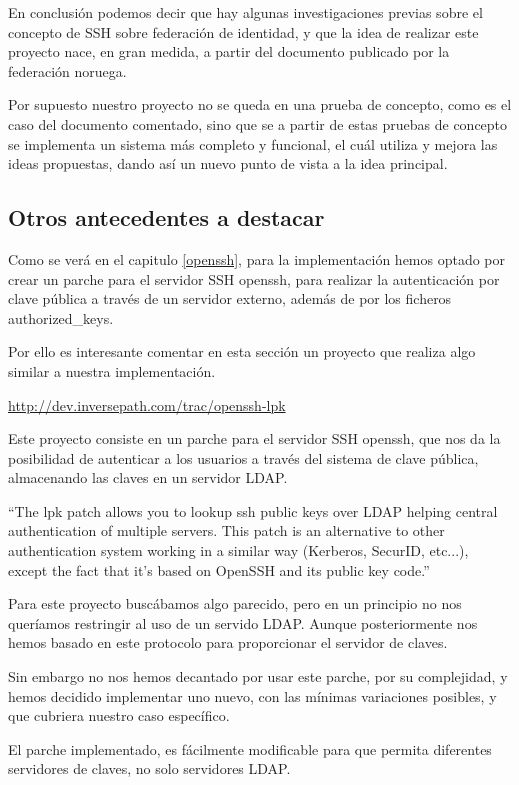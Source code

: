     En conclusión podemos decir que hay algunas investigaciones
    previas sobre el concepto de SSH sobre federación de identidad, y
    que la idea de realizar este proyecto nace, en gran medida, a
    partir del documento publicado por la federación noruega.
    
    Por supuesto nuestro proyecto no se queda en una prueba de
    concepto, como es el caso del documento comentado, sino que se a
    partir de estas pruebas de concepto se implementa un sistema
    más completo y funcional, el cuál utiliza y mejora las ideas
    propuestas, dando así un nuevo punto de vista a la idea principal.

    
    \subsection{Otros antecedentes a destacar}
    
        Como se verá en el capitulo \ref{openssh}, para la
        implementación hemos optado por crear un parche para el
        servidor SSH openssh, para realizar la autenticación por clave
        pública a través de un servidor externo, además de por los
        ficheros authorized\_keys.

        Por ello es interesante comentar en esta sección un proyecto
        que realiza algo similar a nuestra implementación.

        \href{http://dev.inversepath.com/trac/openssh-lpk}{http://dev.inversepath.com/trac/openssh-lpk}

        Este proyecto consiste en un parche para el servidor SSH
        openssh, que nos da la posibilidad de autenticar a los
        usuarios a través del sistema de clave pública, almacenando
        las claves en un servidor LDAP.

        ``The lpk patch allows you to lookup ssh public keys over LDAP
        helping central authentication of multiple servers. This patch
        is an alternative to other authentication system working in a
        similar way (Kerberos, SecurID, etc...), except the fact that
        it's based on OpenSSH and its public key code.''
        
        Para este proyecto buscábamos algo parecido, pero en un
        principio no nos queríamos restringir al uso de un servido
        LDAP. Aunque posteriormente nos hemos basado en este protocolo
        para proporcionar el servidor de claves.

        Sin embargo no nos hemos decantado por usar este parche, por
        su complejidad, y hemos decidido implementar uno nuevo, con
        las mínimas variaciones posibles, y que cubriera nuestro caso
        específico.

        El parche implementado, es fácilmente modificable para que
        permita diferentes servidores de claves, no solo servidores
        LDAP.
